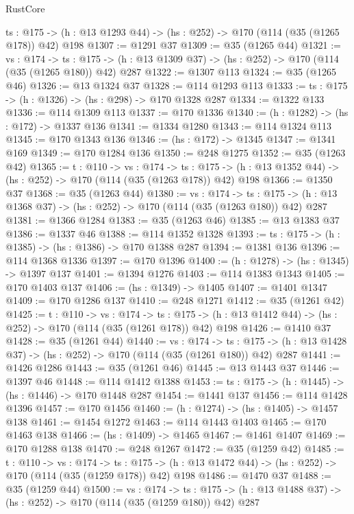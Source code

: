 \begin{lexlean}{RustCore}
\begin{coremodule}
  {ts : @175} -> (h : @13 @1293 @44) -> (hs : @252) -> @170 (@114 (@35 (@1265 @178)) @42) @198
@1307 := @1291 @37
@1309 := @35 (@1265 @44)
@1321 := {vs : @174} ->
  {ts : @175} -> (h : @13 @1309 @37) -> (hs : @252) -> @170 (@114 (@35 (@1265 @180)) @42) @287
@1322 := @1307 @113
@1324 := @35 (@1265 @46)
@1326 := @13 @1324 @37
@1328 := @114 @1293 @113
@1333 := {ts : @175} -> (h : @1326) -> (hs : @298) -> @170 @1328 @287
@1334 := @1322 @133
@1336 := @114 @1309 @113
@1337 := @170 @1336
@1340 := (h : @1282) -> (hs : @172) -> @1337 @136
@1341 := @1334 @1280
@1343 := @114 @1324 @113
@1345 := @170 @1343 @136
@1346 := (hs : @172) -> @1345
@1347 := @1341 @169
@1349 := @170 @1284 @136
@1350 := @248 @1275
@1352 := @35 (@1263 @42)
@1365 := {t : @110} ->
  {vs : @174} ->
  {ts : @175} -> (h : @13 @1352 @44) -> (hs : @252) -> @170 (@114 (@35 (@1263 @178)) @42) @198
@1366 := @1350 @37
@1368 := @35 (@1263 @44)
@1380 := {vs : @174} ->
  {ts : @175} -> (h : @13 @1368 @37) -> (hs : @252) -> @170 (@114 (@35 (@1263 @180)) @42) @287
@1381 := @1366 @1284
@1383 := @35 (@1263 @46)
@1385 := @13 @1383 @37
@1386 := @1337 @46
@1388 := @114 @1352 @1328
@1393 := {ts : @175} -> (h : @1385) -> (hs : @1386) -> @170 @1388 @287
@1394 := @1381 @136
@1396 := @114 @1368 @1336
@1397 := @170 @1396
@1400 := (h : @1278) -> (hs : @1345) -> @1397 @137
@1401 := @1394 @1276
@1403 := @114 @1383 @1343
@1405 := @170 @1403 @137
@1406 := (hs : @1349) -> @1405
@1407 := @1401 @1347
@1409 := @170 @1286 @137
@1410 := @248 @1271
@1412 := @35 (@1261 @42)
@1425 := {t : @110} ->
  {vs : @174} ->
  {ts : @175} -> (h : @13 @1412 @44) -> (hs : @252) -> @170 (@114 (@35 (@1261 @178)) @42) @198
@1426 := @1410 @37
@1428 := @35 (@1261 @44)
@1440 := {vs : @174} ->
  {ts : @175} -> (h : @13 @1428 @37) -> (hs : @252) -> @170 (@114 (@35 (@1261 @180)) @42) @287
@1441 := @1426 @1286
@1443 := @35 (@1261 @46)
@1445 := @13 @1443 @37
@1446 := @1397 @46
@1448 := @114 @1412 @1388
@1453 := {ts : @175} -> (h : @1445) -> (hs : @1446) -> @170 @1448 @287
@1454 := @1441 @137
@1456 := @114 @1428 @1396
@1457 := @170 @1456
@1460 := (h : @1274) -> (hs : @1405) -> @1457 @138
@1461 := @1454 @1272
@1463 := @114 @1443 @1403
@1465 := @170 @1463 @138
@1466 := (hs : @1409) -> @1465
@1467 := @1461 @1407
@1469 := @170 @1288 @138
@1470 := @248 @1267
@1472 := @35 (@1259 @42)
@1485 := {t : @110} ->
  {vs : @174} ->
  {ts : @175} -> (h : @13 @1472 @44) -> (hs : @252) -> @170 (@114 (@35 (@1259 @178)) @42) @198
@1486 := @1470 @37
@1488 := @35 (@1259 @44)
@1500 := {vs : @174} ->
  {ts : @175} -> (h : @13 @1488 @37) -> (hs : @252) -> @170 (@114 (@35 (@1259 @180)) @42) @287

\end{coremodule}
\end{lexlean}
